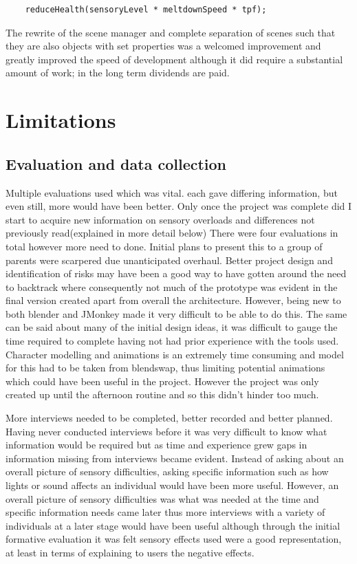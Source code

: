 \documentclass[11pt]{report}
\begin{document}
\begin{lstlisting}
	reduceHealth(sensoryLevel * meltdownSpeed * tpf);
\end{lstlisting}

The rewrite of the scene manager and complete separation of scenes such that they are also objects with set properties was a welcomed improvement and greatly improved the speed of development although it did require a substantial amount of work; in the long term dividends are paid. 

\section{Limitations}

\subsection{Evaluation and data collection}
Multiple evaluations used which was vital. each gave differing information, but even still, more would have been better. Only once the project was complete did I start to acquire new information on sensory overloads and differences not previously read(explained in more detail below)
There were four evaluations in total however more need to done. Initial plans to present this to a group of parents were scarpered due unanticipated overhaul.
Better project design and identification of risks may have been a good way to have gotten around the need to backtrack where consequently not much of the prototype was evident in the final version created apart from overall the architecture. However, being new to both blender and JMonkey made it very difficult to be able to do this. The same can be said about many of the initial design ideas, it was difficult to gauge the time required to complete having not had prior experience with the tools used. Character modelling and animations is an extremely time consuming and model for this had to be taken from blendswap, thus limiting potential animations which could have been useful in the project. However the project was only created up until the afternoon routine and so this didn't hinder too much.

More interviews needed to be completed, better recorded and better planned. Having never conducted interviews before it was very difficult to know what information would be required but as time and experience grew gaps in information missing from interviews became evident. Instead of asking about an overall picture of sensory difficulties, asking specific information such as how lights or sound affects an individual would have been more useful. However, an overall picture of sensory difficulties was what was needed at the time and specific information needs came later thus more interviews with a variety of individuals at a later stage would have been useful although through the initial formative evaluation it was felt sensory effects used were a good representation, at least in terms of explaining to users the negative effects. 
\end{document}
